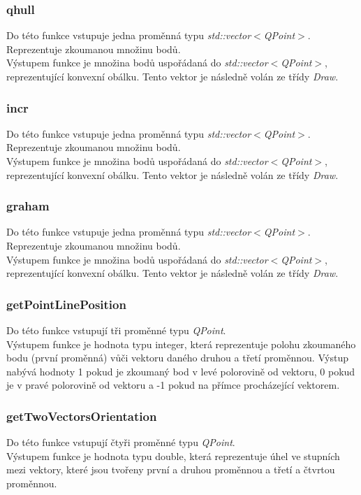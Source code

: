 \documentclass{article}
\begin{document}
\subsubsection{qhull}
Do této funkce vstupuje jedna proměnná typu  \emph{std::vector$<$QPoint$>$}. Reprezentuje zkoumanou množinu bodů.\\
Výstupem funkce je množina bodů uspořádaná do \emph{std::vector$<$QPoint$>$}, reprezentující konvexní obálku. Tento vektor je následně volán ze třídy \emph{Draw}.

\subsubsection{incr}
Do této funkce vstupuje jedna proměnná typu  \emph{std::vector$<$QPoint$>$}. Reprezentuje zkoumanou množinu bodů.\\
Výstupem funkce je množina bodů uspořádaná do \emph{std::vector$<$QPoint$>$}, reprezentující konvexní obálku. Tento vektor je následně volán ze třídy \emph{Draw}.

\subsubsection{graham}
Do této funkce vstupuje jedna proměnná typu  \emph{std::vector$<$QPoint$>$}. Reprezentuje zkoumanou množinu bodů.\\
Výstupem funkce je množina bodů uspořádaná do \emph{std::vector$<$QPoint$>$}, reprezentující konvexní obálku. Tento vektor je následně volán ze třídy \emph{Draw}.

\subsubsection{getPointLinePosition}
Do této funkce vstupují tři proměnné typu \emph{QPoint}.\\
Výstupem funkce je hodnota typu integer, která reprezentuje polohu zkoumaného bodu (první proměnná) vůči vektoru daného druhou a třetí proměnnou. Výstup nabývá hodnoty 1 pokud je zkoumaný bod v levé polorovině od vektoru, 0 pokud je v pravé polorovině od vektoru a -1 pokud na přímce procházející vektorem.

\subsubsection{getTwoVectorsOrientation}
Do této funkce vstupují čtyři proměnné typu \emph{QPoint}.\\
Výstupem funkce je hodnota typu double, která reprezentuje úhel ve stupních mezi vektory, které jsou tvořeny první a druhou proměnnou a třetí a čtvrtou proměnnou.
\end{document}
